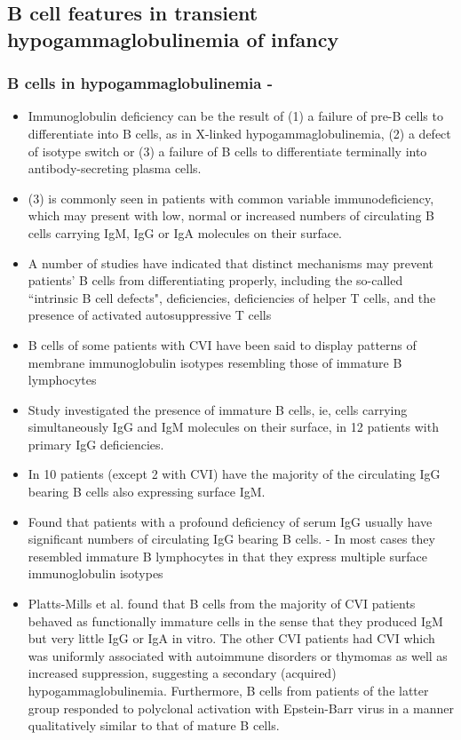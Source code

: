 \documentclass[12pt]{article}
\begin{document}
	\subsection{B cell features in transient hypogammaglobulinemia of infancy}
	
	\subsubsection{B cells in hypogammaglobulinemia - \citeauthor{Fiorilli86} \citeyear{Fiorilli86}}
	
	
	
	\begin{itemize}
		\item Immunoglobulin deficiency can be the result of (1) a failure of pre-B cells to differentiate into B cells, as in X-linked hypogammaglobulinemia, (2) a defect of isotype switch or (3) a failure of B cells to differentiate terminally into antibody-secreting plasma cells.
		\item (3) is commonly seen in patients with common variable immunodeficiency, which may present with low, normal or increased numbers of circulating B cells carrying IgM, IgG or IgA molecules on their surface.
		\item A number of studies have indicated that distinct mechanisms may prevent patients' B cells from differentiating properly, including the so-called ``intrinsic B cell defects", deficiencies, deficiencies of helper T cells, and the presence of activated autosuppressive T cells
		\item B cells of some patients with CVI have been said to display patterns of membrane immunoglobulin isotypes resembling those of immature B lymphocytes
		\item Study investigated the presence of immature B cells, ie, cells carrying simultaneously IgG and IgM molecules on their surface, in 12 patients with primary IgG deficiencies. 
		\item In 10 patients (except 2 with CVI) have the majority of the circulating IgG bearing B cells also expressing surface IgM. 
		\item Found that patients with a profound deficiency of serum IgG usually have significant numbers of circulating IgG bearing B cells. - In most cases they resembled immature B lymphocytes in that they express multiple surface immunoglobulin isotypes
		\item Platts-Mills et al. found that B cells from the majority of CVI patients behaved as functionally immature cells in the sense that they produced IgM but very little IgG or IgA in vitro. The other CVI patients had CVI which was uniformly associated with autoimmune disorders or thymomas as well as increased suppression, suggesting a secondary (acquired) hypogammaglobulinemia. Furthermore, B cells from patients of the latter group responded to polyclonal activation with Epstein-Barr virus in a manner qualitatively similar to that of mature B cells. 
	\end{itemize}
	
\end{document}

